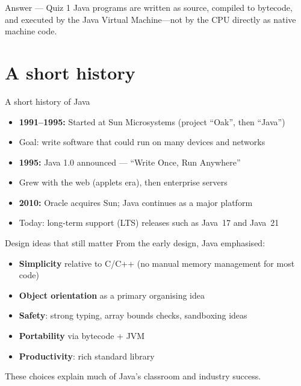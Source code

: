 \documentclass[aspectratio=169,11pt]{beamer}
\begin{document}
    \begin{frame}{Answer --- Quiz 1}
        \vspace{0.4em}
        Java programs are written as source, compiled to bytecode, and executed by the
        Java Virtual Machine---not by the CPU directly as native machine code.
    \end{frame}

    \section{A short history}

    \begin{frame}{A short history of Java}
        \begin{itemize}
            \item \textbf{1991--1995:} Started at Sun Microsystems (project ``Oak'', then ``Java'')
            \item Goal: write software that could run on many devices and networks
            \item \textbf{1995:} Java 1.0 announced --- ``Write Once, Run Anywhere''
            \item Grew with the web (applets era), then enterprise servers
            \item \textbf{2010:} Oracle acquires Sun; Java continues as a major platform
            \item Today: long-term support (LTS) releases such as Java~17 and Java~21
        \end{itemize}
    \end{frame}

    \begin{frame}{Design ideas that still matter}
        From the early design, Java emphasised:
        \begin{itemize}
            \item \textbf{Simplicity} relative to C/C++ (no manual memory management for most code)
            \item \textbf{Object orientation} as a primary organising idea
            \item \textbf{Safety}: strong typing, array bounds checks, sandboxing ideas
            \item \textbf{Portability} via bytecode + JVM
            \item \textbf{Productivity}: rich standard library
        \end{itemize}
        \vspace{0.5em}
        These choices explain much of Java's classroom and industry success.
    \end{frame}
\end{document}
